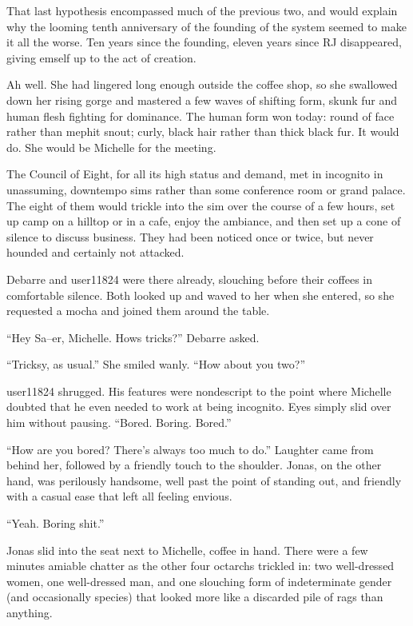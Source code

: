 That last hypothesis encompassed much of the previous two, and would explain why the looming tenth anniversary of the founding of the system seemed to make it all the worse. Ten years since the founding, eleven years since RJ disappeared, giving emself up to the act of creation.

Ah well. She had lingered long enough outside the coffee shop, so she swallowed down her rising gorge and mastered a few waves of shifting form, skunk fur and human flesh fighting for dominance. The human form won today: round of face rather than mephit snout; curly, black hair rather than thick black fur. It would do. She would be Michelle for the meeting.

The Council of Eight, for all its high status and demand, met in incognito in unassuming, downtempo sims rather than some conference room or grand palace. The eight of them would trickle into the sim over the course of a few hours, set up camp on a hilltop or in a cafe, enjoy the ambiance, and then set up a cone of silence to discuss business. They had been noticed once or twice, but never hounded and certainly not attacked.

Debarre and user11824 were there already, slouching before their coffees in comfortable silence. Both looked up and waved to her when she entered, so she requested a mocha and joined them around the table.

``Hey Sa--er, Michelle. Hows tricks?'' Debarre asked.

``Tricksy, as usual.'' She smiled wanly. ``How about you two?''

user11824 shrugged. His features were nondescript to the point where Michelle doubted that he even needed to work at being incognito. Eyes simply slid over him without pausing. ``Bored. Boring. Bored.''

``How are you bored? There's always too much to do.'' Laughter came from behind her, followed by a friendly touch to the shoulder. Jonas, on the other hand, was perilously handsome, well past the point of standing out, and friendly with a casual ease that left all feeling envious.

``Yeah. Boring shit.''

Jonas slid into the seat next to Michelle, coffee in hand. There were a few minutes amiable chatter as the other four octarchs trickled in: two well-dressed women, one well-dressed man, and one slouching form of indeterminate gender (and occasionally species) that looked more like a discarded pile of rags than anything.


